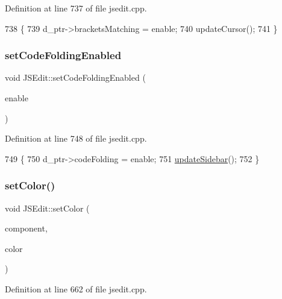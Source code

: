 Definition at line 737 of file jsedit.\+cpp.


\begin{DoxyCode}
738 \{
739     d\_ptr->bracketsMatching = enable;
740     updateCursor();
741 \}
\end{DoxyCode}
\mbox{\label{class_j_s_edit_a3a90bd08f93058ab17d03fe8538802f4}} 
\subsubsection{\texorpdfstring{set\+Code\+Folding\+Enabled}{setCodeFoldingEnabled}}
{\footnotesize\ttfamily void J\+S\+Edit\+::set\+Code\+Folding\+Enabled (\begin{DoxyParamCaption}\item[{bool}]{enable }\end{DoxyParamCaption})\hspace{0.3cm}{\ttfamily [slot]}}



Definition at line 748 of file jsedit.\+cpp.


\begin{DoxyCode}
749 \{
750     d\_ptr->codeFolding = enable;
751     \hyperlink{class_j_s_edit_ac51a3a9f7b1e8c5bc98b345bfc3d3b53}{updateSidebar}();
752 \}
\end{DoxyCode}
\mbox{\label{class_j_s_edit_a783833bb402b29457f3ec268e5a8ae57}} 
\subsubsection{\texorpdfstring{set\+Color()}{setColor()}}
{\footnotesize\ttfamily void J\+S\+Edit\+::set\+Color (\begin{DoxyParamCaption}\item[{\hyperlink{class_j_s_edit_a5a465193a1344e5be9b04f5ff7883213}{Color\+Component}}]{component,  }\item[{const Q\+Color \&}]{color }\end{DoxyParamCaption})}



Definition at line 662 of file jsedit.\+cpp.


